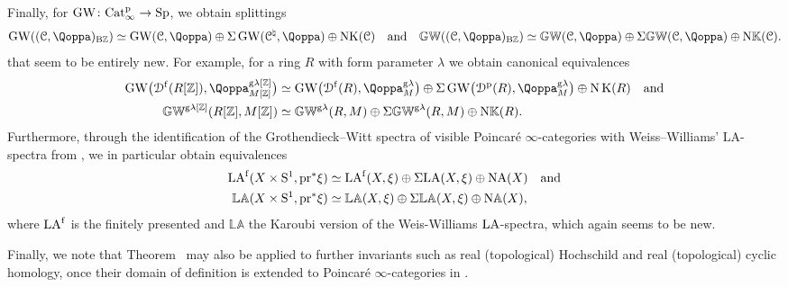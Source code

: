 Finally, for $\operatorname{GW}\colon \mathrm{Cat}^{\mathrm p}_\infty \to \mathrm{Sp}$, %
we obtain splittings
\[
\GW((\C,\QF)_{\mathrm B\mathbb Z}) \simeq \GW(\C,\QF) \oplus \Sigma \GW(\C^\natural,\QF) \oplus \mathrm{NK}(\C) \quad\text{and}\quad \KGW((\C,\QF)_{\mathrm B\mathbb Z}) \simeq \KGW(\C,\QF) \oplus \Sigma \KGW(\C,\QF) \oplus \N\KK(\C).
\]
that seem to be entirely new. For example, for a ring $R$ with form parameter $\lambda$ we obtain canonical equivalences
\begin{align*}
\GW\bigl(\Dfree(R[\ZZ]),\QF_{M[\ZZ]}^{\g\lambda[\ZZ]}\bigr) & \simeq \GW\bigl(\Dfree(R),\QF^{\g\lambda}_{M}\bigr) \oplus \Sigma \GW\bigl(\Dperf(R),\QF^{\g\lambda}_M\bigr) \oplus \N\K(R) \quad\text{and}\\
\KGW^{\g\lambda[\ZZ]}(R[\ZZ],M[\ZZ]) & \simeq \KGW^{\g\lambda}(R,M) \oplus \Sigma \KGW^{\g\lambda}(R,M) \oplus \N\KK(R).
\end{align*}
Furthermore, through 
the identification of the Grothendieck--Witt spectra of visible Poincar\'e $\infty$-categories with Weiss--Williams' LA-spectra from \papertwo, we in particular obtain equivalences
\begin{align*}
\mathrm{LA}^{\mathrm{f}}(X \times \mathrm S^1, \mathrm{pr}^\ast \xi) &\simeq \mathrm{LA}^{\mathrm{f}}(X, \xi) \oplus \Sigma  \mathrm{LA}(X, \xi) \oplus \mathrm N\mathrm A(X) \quad\text{and}\\
\mathbb{LA}(X \times \mathrm S^1, \mathrm{pr}^\ast \xi) &\simeq \mathbb{LA}(X, \xi) \oplus \Sigma  \mathbb{LA}(X, \xi) \oplus \mathrm N\mathbb A(X),
\end{align*}
where $\mathrm{LA}^{\mathrm{f}}$ is the finitely presented and $\mathbb{LA}$ the Karoubi version of the Weis-Williams $\mathrm{LA}$-spectra, 
which again seems to be new.


Finally, we note that Theorem~ may also be applied to further invariants such as real (topological) Hochschild and real (topological) cyclic homology, once their domain of definition is extended to Poincar\'e $\infty$-categories in \cite{Harpaz-Nikolaus-Shah}.

